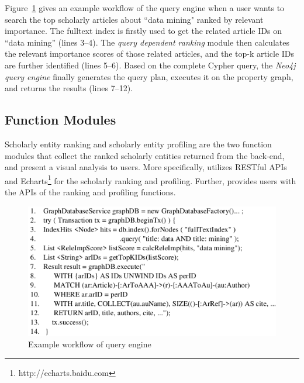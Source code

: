 

% 


Figure~\ref{fig:queryProcess} gives an example workflow of the query engine when a user wants to search the top scholarly articles about ``data mining"  ranked by relevant importance. The fulltext index is firstly used to get the related article IDs on ``data mining'' (lines 3--4). The {\em query dependent ranking} module then calculates the relevant importance scores of those related articles, and the top-k article IDs are further identified (lines 5--6). Based on the complete Cypher query, the {\em Neo4j query engine} finally generates the query plan, executes it on the property graph, and returns the results (lines 7--12).







\subsection{Function Modules}
Scholarly entity ranking and scholarly entity profiling are the two function modules that collect the ranked scholarly entities returned from the back-end, and present a visual analysis to users. More specifically, \oursystem utilizes RESTful APIs  and Echarts\footnote{ http://echarts.baidu.com} for the scholarly ranking and profiling. Further, \oursystem provides users with the APIs of the ranking and profiling functions.

\begin{figure}
\centering
\includegraphics[width=\columnwidth]{queryProcess.pdf}
\vspace{-3ex}
\caption{Example workflow of \oursystem query engine}
\label{fig:queryProcess}
\vspace{-2ex}
\end{figure}





